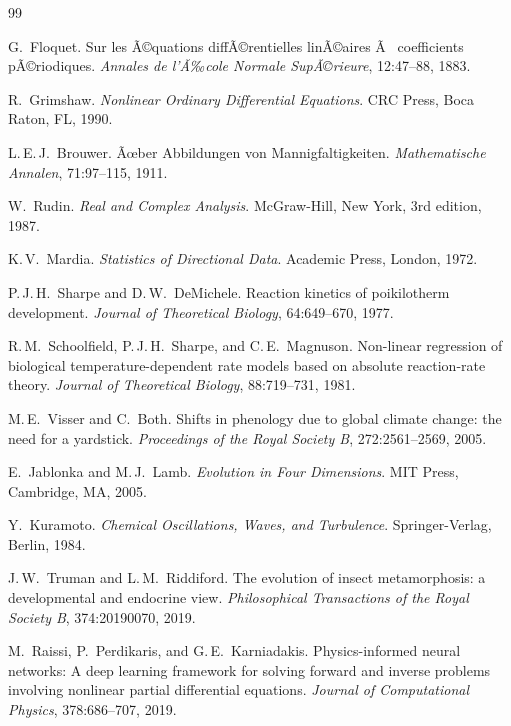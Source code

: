 ﻿\documentclass[12pt, a4paper]{article}
\theoremstyle{definition}
\begin{document}
\begin{thebibliography}{99}
 
G.~Floquet.
\newblock Sur les Ã©quations diffÃ©rentielles linÃ©aires Ã  coefficients
  pÃ©riodiques.
\newblock \emph{Annales de l'Ã‰cole Normale SupÃ©rieure}, 12:47--88, 1883.
 
R.~Grimshaw.
\newblock \emph{Nonlinear Ordinary Differential Equations}.
\newblock CRC Press, Boca Raton, FL, 1990.
 
L.\,E.\,J.~Brouwer.
\newblock Ãœber Abbildungen von Mannigfaltigkeiten.
\newblock \emph{Mathematische Annalen}, 71:97--115, 1911.
 
W.~Rudin.
\newblock \emph{Real and Complex Analysis}.
\newblock McGraw-Hill, New York, 3rd edition, 1987.
 
K.\,V.~Mardia.
\newblock \emph{Statistics of Directional Data}.
\newblock Academic Press, London, 1972.
 
P.\,J.\,H.~Sharpe and D.\,W.~DeMichele.
\newblock Reaction kinetics of poikilotherm development.
\newblock \emph{Journal of Theoretical Biology}, 64:649--670, 1977.
 
R.\,M.~Schoolfield, P.\,J.\,H.~Sharpe, and C.\,E.~Magnuson.
\newblock Non-linear regression of biological temperature-dependent rate models
  based on absolute reaction-rate theory.
\newblock \emph{Journal of Theoretical Biology}, 88:719--731, 1981.
 
M.\,E.~Visser and C.~Both.
\newblock Shifts in phenology due to global climate change: the need for a
  yardstick.
\newblock \emph{Proceedings of the Royal Society B}, 272:2561--2569, 2005.
 
E.~Jablonka and M.\,J.~Lamb.
\newblock \emph{Evolution in Four Dimensions}.
\newblock MIT Press, Cambridge, MA, 2005.
 
Y.~Kuramoto.
\newblock \emph{Chemical Oscillations, Waves, and Turbulence}.
\newblock Springer-Verlag, Berlin, 1984.
 
J.\,W.~Truman and L.\,M.~Riddiford.
\newblock The evolution of insect metamorphosis: a developmental and endocrine
  view.
\newblock \emph{Philosophical Transactions of the Royal Society B}, 374:20190070,
  2019.
 
M.~Raissi, P.~Perdikaris, and G.\,E.~Karniadakis.
\newblock Physics-informed neural networks: A deep learning framework for solving
  forward and inverse problems involving nonlinear partial differential equations.
\newblock \emph{Journal of Computational Physics}, 378:686--707, 2019.
 

\end{thebibliography}
\end{document}
